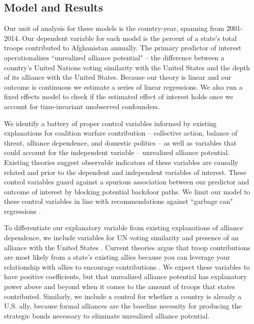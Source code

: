 \documentclass[12pt,letterpaper]{article}
\begin{document}
	\subsection{Model and Results}
		Our unit of analysis for these models is the country-year, spanning from 2001-2014. Our dependent variable for each model is the percent of a state's total troops contributed to Afghanistan annually. The primary predictor of interest operationalizes ``unrealized alliance potential" -- the difference between a country's United Nations voting similarity with the United States and the depth of its alliance with the United States. Because our theory is linear and our outcome is continuous we estimate a series of linear regressions. We also run a fixed effects model to check if the estimated effect of interest holds once we account for time-invariant unobserved confounders.

        We identify a battery of proper control variables informed by existing explanations for coalition warfare contribution -- collective action, balance of threat, alliance dependence, and domestic politics -- as well as variables that could account for the independent variable -- unrealized alliance potential. Existing theories suggest observable indicators of these variables are causally related and prior to the dependent and independent variables of interest. These control variables guard against a spurious association between our predictor and outcome of interest by blocking potential backdoor paths. We limit our model to these control variables in line with recommendations against ``garbage can" regressions \citep{ray_explaininginterstateconflict_2003, bleek_securityguaranteesallied_2014}.

        To differentiate our explanatory variable from existing explanations of alliance dependence, we include variables for UN voting similarity and presence of an alliance with the United States \citep{bailey_estimatingdynamicstate_2017}. Current theories argue that troop contributions are most likely from a state's existing allies because you can leverage your relationship with allies to encourage contributions \citep{davidson_neoclassicalrealistexplanation_2011}. We expect these variables to have positive coefficients, but that unrealized alliance potential has explanatory power above and beyond when it comes to the amount of troops that states contributed. Similarly, we include a control for whether a country is already a U.S. ally, because formal alliances are the baseline necessity for producing the strategic bonds necessary to eliminate unrealized alliance potential.
\end{document}
